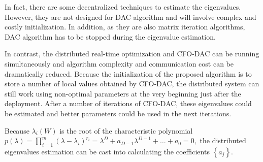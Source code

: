 In fact, there are some decentralized techniques \cite{Kempe2008}\cite{Franceschelli2009}\cite{Yang2010}
to estimate the eigenvalues. However, they are not designed for DAC
algorithm and will involve complex and costly initialization. In addition,
as they are also matrix iteration algorithms, DAC algorithm has to
be stopped during the eigenvalue estimation. 

In contrast, the distributed real-time optimization and CFO-DAC can
be running simultaneously  and algorithm complexity and communication
cost can be dramatically reduced. Because the initialization of the
proposed algorithm is to store a number of local values  obtained
by  CFO-DAC, the distributed system can still work using non-optimal
parameters at the very beginning just after the deployment. After
a number of iterations of CFO-DAC, these eigenvalues could be estimated
and better parameters could be used in the next iterations.

  

Because $\lambda_{i}\left(W\right)$ is the root of the characteristic
polynomial $p(\lambda)=\prod_{i=1}^{m}\left(\lambda-\lambda_{i}\right)^{r_{i}}=\lambda^{D}+a_{D-1}\lambda^{D-1}+\ldots+a_{0}=0,$
the distributed eigenvalues estimation can be cast into calculating
the coefficients $\left\{ a_{j}\right\} $. 

